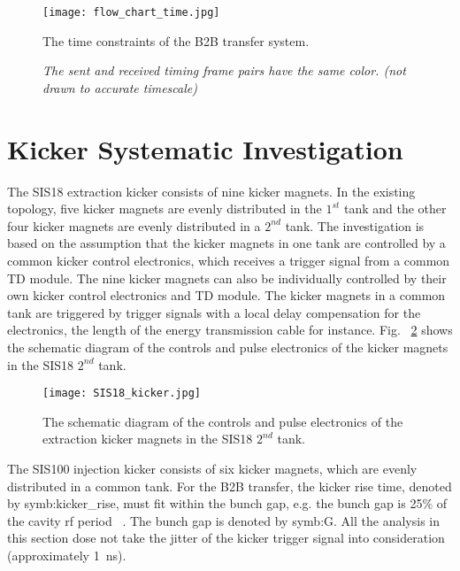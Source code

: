 \begin{landscape}
\begin{figure}[!htb]
   \centering   
   \texttt{[image: flow\_chart\_time.jpg]}
   \caption{The time constraints of the B2B transfer system.}
   \caption*{\textsl{\small{The sent and received timing frame pairs have the same color. (not drawn to accurate timescale) }}}
   \label{time_constraint}
\end{figure}
\end{landscape}

\section{Kicker Systematic Investigation}
\label{real_kicker}
The SIS18 extraction kicker consists of nine kicker magnets. In the existing topology, five kicker magnets are evenly distributed in the $1^{st}$ tank and the other four kicker magnets are evenly distributed in a $2^{nd}$ tank. The investigation is based on the assumption that the kicker magnets in one tank are controlled by a common kicker control electronics, which receives a trigger signal from a common TD module. The nine kicker magnets can also be individually controlled by their own kicker control electronics and TD module. The kicker magnets in a common tank are triggered by trigger signals with a local delay compensation for the electronics, the length of the energy transmission cable for instance. Fig. ~\ref{SIS18_kicker} shows the schematic diagram of the controls and pulse electronics of the kicker magnets in the SIS18 $2^{nd}$ tank. 
\begin{figure}[H]
   \centering   
   \texttt{[image: SIS18\_kicker.jpg]}
   \caption{The schematic diagram of the controls and pulse electronics of the extraction kicker magnets in the SIS18 $2^{nd}$ tank.}
   \label{SIS18_kicker}
\end{figure}

The SIS100 injection kicker consists of six kicker magnets, which are evenly distributed in a common tank. For the B2B transfer, the kicker rise time, denoted by \gls{symb:kicker_rise}, must fit within the bunch gap, e.g. the bunch gap is 25$\%$ of the cavity rf period ~\cite{blell_injection_2014, liebermann_sis100_2013}. The bunch gap is denoted by \gls{symb:G}.  All the analysis in this section dose not take the jitter of the kicker trigger signal into consideration (approximately \SI{1}{ns}). 

